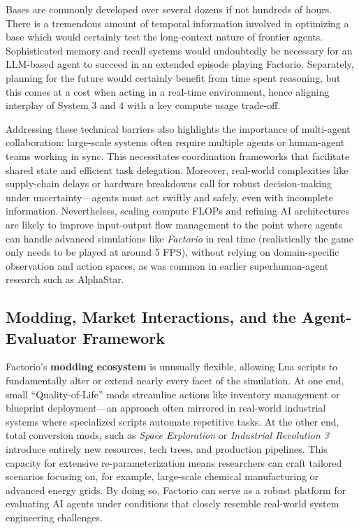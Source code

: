 Bases are commonly developed over several dozens if not hundreds of hours. There is a tremendous amount of temporal information involved in optimizing a base which would certainly test the long-context nature of frontier agents. Sophisticated memory and recall systems would undoubtedly be necessary for an LLM-based agent to succeed in an extended episode playing Factorio. Separately, planning for the future would certainly benefit from time spent reasoning, but this comes at a cost when acting in a real-time environment, hence aligning interplay of System 3 and 4 with a key compute usage trade-off.

Addressing these technical barriers also highlights the importance of multi-agent collaboration: large-scale systems often require multiple agents or human-agent teams working in sync. This necessitates coordination frameworks that facilitate shared state and efficient task delegation. Moreover, real-world complexities like supply-chain delays or hardware breakdowns call for robust decision-making under uncertainty—agents must act swiftly and safely, even with incomplete information. Nevertheless, scaling compute FLOPs and refining AI architectures are likely to improve input-output flow management to the point where agents can handle advanced simulations like \textit{Factorio} in real time (realistically the game only needs to be played at around 5 FPS), without relying on domain-specific observation and action spaces, as was common in earlier superhuman-agent research such as AlphaStar.

\subsection{Modding, Market Interactions, and the Agent-Evaluator Framework}

Factorio’s \textbf{modding ecosystem} is unusually flexible, allowing Lua scripts to fundamentally alter or extend nearly every facet of the simulation. At one end, small “Quality-of-Life” mods streamline actions like inventory management or blueprint deployment—an approach often mirrored in real-world industrial systems where specialized scripts automate repetitive tasks. At the other end, total conversion mods, such as \textit{Space Exploration} \cite{spaceExploration} or \textit{Industrial Revolution 3} \cite{industrialRevolution} introduce entirely new resources, tech trees, and production pipelines. This capacity for extensive re-parameterization means researchers can craft tailored scenarios focusing on, for example, large-scale chemical manufacturing or advanced energy grids. By doing so, Factorio can serve as a robust platform for evaluating AI agents under conditions that closely resemble real-world system engineering challenges.

